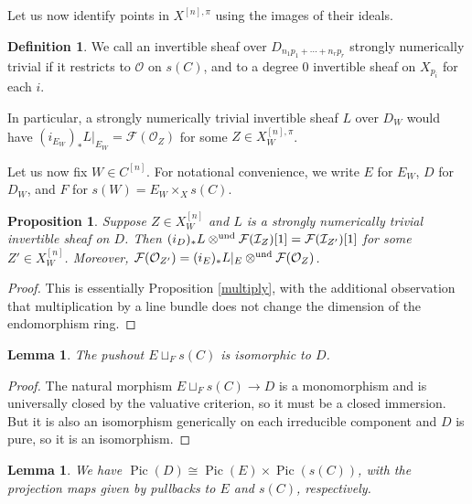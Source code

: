 \documentclass{amsart}
\theoremstyle{plain}
\newtheorem{lemma}[theorem]{Lemma}
\newtheorem{proposition}[theorem]{Proposition}
\theoremstyle{definition}
\newtheorem{definition}[theorem]{Definition}
\theoremstyle{remark}
\begin{document}
    Let us now identify points in $X^{[n],\pi}$ using the images of their ideals.
    \begin{definition}
        We call an invertible sheaf over $D_{n_1p_1+\cdots+n_rp_r}$ strongly numerically trivial if it restricts to $\mathcal O$ on $s(C)$, and to a degree $0$ invertible sheaf on $X_{p_i}$ for each $i$.
    \end{definition}
    In particular, a strongly numerically trivial invertible sheaf $L$ over $D_W$ would have $(i_{E_W})_\ast L|_{E_W}=\mathcal F(\mathcal O_Z)$ for some $Z\in X^{[n],\pi}_W$.

    Let us now fix $W\in C^{[n]}$.
    For notational convenience, we write $E$ for $E_W$, $D$ for $D_W$, and $F$ for $s(W)=E_W\times_Xs(C)$.
    \begin{proposition}\label{multiply_ideals}
        Suppose $Z\in X^{[n]}_W$ and $L$ is a strongly numerically trivial invertible sheaf on $D$.
        Then $(i_D)_\ast L\otimes^{\rm und}\mathcal F(\mathcal I_Z)[1]=\mathcal F(\mathcal I_{Z'})[1]$ for some $Z'\in X^{[n]}_W$.
        Moreover, $\mathcal F(\mathcal O_{Z'})=(i_E)_\ast L|_E\otimes^{\rm und}\mathcal F(\mathcal O_Z)$.
    \end{proposition}
    \begin{proof}
        This is essentially Proposition \ref{multiply}, with the additional observation that multiplication by a line bundle does not change the dimension of the endomorphism ring.
    \end{proof}
    \begin{lemma}\label{pushoutDEF}
        The pushout $E\sqcup_Fs(C)$ is isomorphic to $D$.
    \end{lemma}
    \begin{proof}
        The natural morphism $E\sqcup_Fs(C)\to D$ is a monomorphism and is universally closed by the valuative criterion, so it must be a closed immersion.
        But it is also an isomorphism generically on each irreducible component and $D$ is pure, so it is an isomorphism.
    \end{proof}
    \begin{lemma}
        We have $\operatorname{Pic}(D)\cong \operatorname{Pic}(E)\times\operatorname{Pic}(s(C))$, with the projection maps given by pullbacks to $E$ and $s(C)$, respectively.
    \end{lemma}
\end{document}
